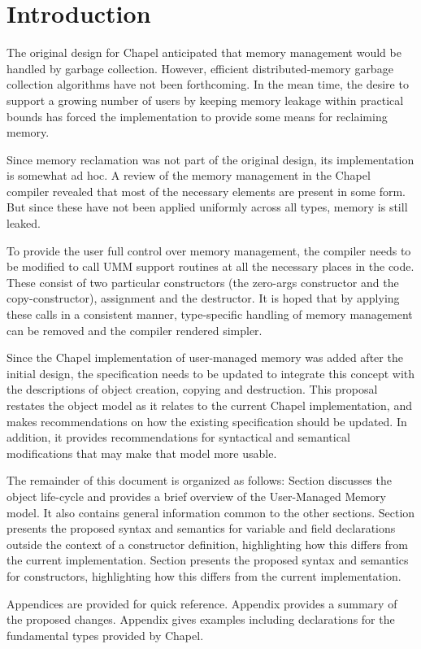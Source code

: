 \section{Introduction}

The original design for Chapel anticipated that memory management would be handled
by garbage collection.  However, efficient distributed-memory garbage collection
algorithms have not been forthcoming.  In the mean time, the desire to support a growing
number of users by keeping memory leakage within practical bounds has forced the
implementation to provide some means for reclaiming memory.  

Since memory reclamation was not part of the original design, its implementation is somewhat
ad hoc.  A review of the memory management in the Chapel compiler revealed
that most of the necessary elements are present in some form.  But since these have not
been applied uniformly across all types, memory is still leaked.

To provide the user full control over memory management, the compiler needs to be modified
to call UMM support routines at all the necessary places in the code.  These consist
of two particular constructors (the zero-args constructor and the copy-constructor),
assignment and the destructor.  It is hoped that by applying these calls in a consistent
manner, type-specific handling of memory management can be removed and the compiler
rendered simpler.

Since the Chapel implementation of user-managed memory was added after the initial design,
the specification needs to be updated to integrate this concept with the descriptions of
object creation, copying and destruction.  This proposal restates the object
model as it relates to the current Chapel implementation, and makes recommendations on how
the existing specification should be updated.  In addition, it provides recommendations for
syntactical and semantical modifications that may make that model more usable.

The remainder of this document is organized as follows: Section  discusses
the object life-cycle and provides a brief overview of the User-Managed Memory model.  It
also contains general information common to the other sections.  Section
 presents the proposed syntax and semantics for variable and field
declarations outside the context of a constructor definition, highlighting how this
differs from the current implementation.  Section  presents the
proposed syntax and semantics for constructors, highlighting how this differs from the
current implementation.

Appendices are provided for quick reference.  Appendix  provides a summary of the
proposed changes.  Appendix  gives examples including declarations for the
fundamental types provided by Chapel.

